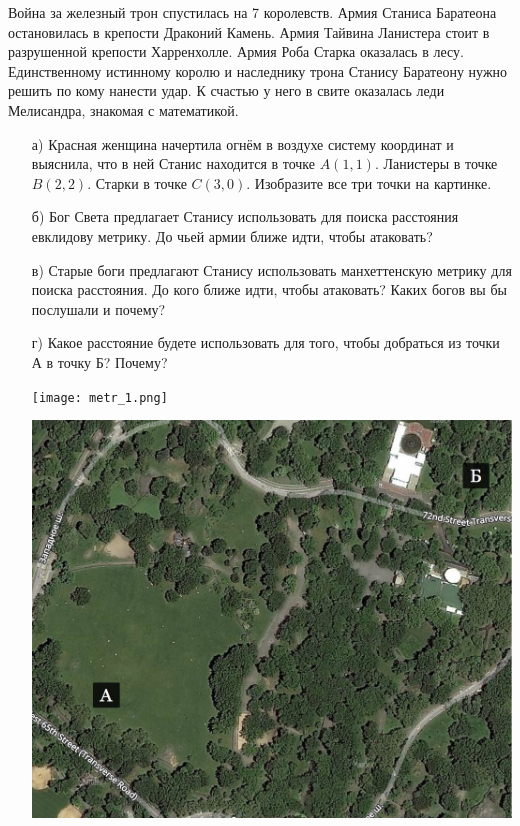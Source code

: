 \documentclass[12pt, a4paper, oneside]{article}
\begin{document}
Война за железный трон спустилась на 7 королевств. Армия Станиса Баратеона остановилась в крепости Драконий Камень. Армия Тайвина Ланистера стоит в разрушенной крепости Харренхолле. Армия Роба Старка оказалась в лесу. Единственному истинному королю и наследнику трона Станису Баратеону нужно решить по кому нанести удар. К счастью у него в свите оказалась леди Мелисандра, знакомая с математикой. 

\begin{enumerate}
\item[а)]  Красная женщина начертила огнём в воздухе систему координат и выяснила, что в ней Станис находится в точке $A(1,1)$. Ланистеры в точке $B(2,2)$. Старки в точке $C(3,0)$. Изобразите все три точки на картинке.

\item[б)]  Бог Света предлагает Станису использовать для поиска расстояния евклидову метрику. До чьей армии ближе идти, чтобы атаковать? 

\item[в)]  Старые боги предлагают Станису использовать манхеттенскую метрику для поиска расстояния. До кого ближе идти, чтобы атаковать?  Каких богов вы бы послушали и почему? 

\item[г)] Какое расстояние будете использовать для того, чтобы добраться из точки А в точку Б? Почему? 

\begin{minipage}[t]{0.45\textwidth}
	\texttt{[image: metr\_1.png]}
\end{minipage}
\hfill
\begin{minipage}[t]{0.45\textwidth}
	\includegraphics[scale=0.13]{metr_2.png}
\end{minipage}

\end{enumerate}
\end{document}
